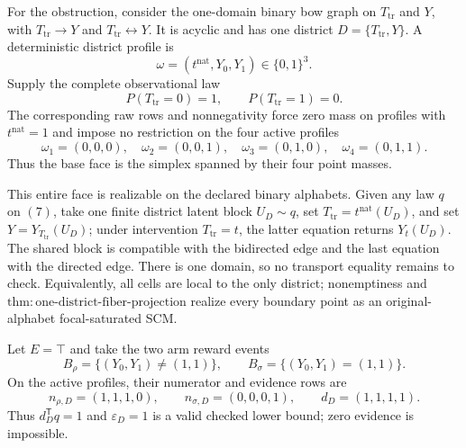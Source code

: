 For the obstruction, consider the one-domain binary bow graph on
\(T_{\mathrm{tr}}\) and \(Y\), with
\(T_{\mathrm{tr}}\to Y\) and \(T_{\mathrm{tr}}\leftrightarrow Y\).  It is acyclic
and has one district \(D=\{T_{\mathrm{tr}},Y\}\).  A deterministic district profile
is
\[
\omega=(t^{\mathrm{nat}},Y_0,Y_1)\in\{0,1\}^3.
\tag{5}
\]
Supply the complete observational law
\[
P(T_{\mathrm{tr}}=0)=1,
\qquad P(T_{\mathrm{tr}}=1)=0.
\tag{6}
\]
The corresponding raw rows and nonnegativity force zero mass on profiles with
\(t^{\mathrm{nat}}=1\) and impose no restriction on the four active profiles
\[
\omega_1=(0,0,0),\quad
\omega_2=(0,0,1),\quad
\omega_3=(0,1,0),\quad
\omega_4=(0,1,1).
\tag{7}
\]
Thus the base face is the simplex spanned by their four point masses.

This entire face is realizable on the declared binary alphabets.  Given any law
\(q\) on \((7)\), take one finite district latent block \(U_D\sim q\), set
\(T_{\mathrm{tr}}=t^{\mathrm{nat}}(U_D)\), and set
\(Y=Y_{T_{\mathrm{tr}}}(U_D)\); under intervention
\(T_{\mathrm{tr}}=t\), the latter equation returns \(Y_t(U_D)\).  The shared block
is compatible with the bidirected edge and the last equation with the directed edge.
There is one domain, so no transport equality remains to check.  Equivalently, all
cells are local to the only district; nonemptiness and
\(\mathrm{thm:one\text{-}district\text{-}fiber\text{-}projection}\) realize every
boundary point as an original-alphabet focal-saturated SCM.

Let \(E=\top\) and take the two arm reward events
\[
B_\rho=\{(Y_0,Y_1)\ne(1,1)\},
\qquad
B_\sigma=\{(Y_0,Y_1)=(1,1)\}.
\tag{8}
\]
On the active profiles, their numerator and evidence rows are
\[
n_{\rho,D}=(1,1,1,0),\qquad
n_{\sigma,D}=(0,0,0,1),\qquad
d_D=(1,1,1,1).
\tag{9}
\]
Thus \(d_D^{\mathsf T}q=1\) and \(\varepsilon_D=1\) is a valid checked lower
bound; zero evidence is impossible.

